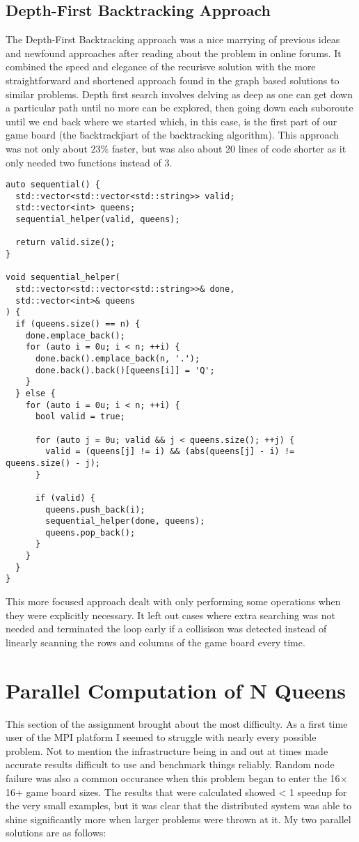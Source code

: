 \documentclass[11pt]{article}
\begin{document}
\subsection{Depth-First Backtracking Approach}
The Depth-First Backtracking approach was a nice marrying of previous ideas and newfound approaches after reading about the problem in online forums. It combined the speed and
elegance of the recurisve solution with the more straightforward and shortened approach found in the graph based solutions to similar problems.
Depth first search involves delving as deep as one can get down a particular path until no more can be explored, then going down each suboroute until we end back where we started which, in this case, is the first part of our game board (the \"backtrack\" part of the backtracking algorithm).
This approach was not only about 23\% faster, but was also about 20 lines of code shorter as it only needed two functions instead of 3.
\lstset{frame=tb,language=c++}
\begin{lstlisting}
auto sequential() {
  std::vector<std::vector<std::string>> valid;
  std::vector<int> queens;
  sequential_helper(valid, queens);

  return valid.size();
}

void sequential_helper(
  std::vector<std::vector<std::string>>& done,
  std::vector<int>& queens
) {
  if (queens.size() == n) {
    done.emplace_back();
    for (auto i = 0u; i < n; ++i) {
      done.back().emplace_back(n, '.');
      done.back().back()[queens[i]] = 'Q';
    }
  } else {
    for (auto i = 0u; i < n; ++i) {
      bool valid = true;

      for (auto j = 0u; valid && j < queens.size(); ++j) {
        valid = (queens[j] != i) && (abs(queens[j] - i) != queens.size() - j);
      }

      if (valid) {
        queens.push_back(i);
        sequential_helper(done, queens);
        queens.pop_back();
      }
    }
  }
}
\end{lstlisting}
This more focused approach dealt with only performing some operations when they were explicitly necessary. It left out cases where extra searching was not needed and terminated the loop early if a collisison was detected instead of linearly scanning the rows and columns of the game board every time.

\section{Parallel Computation of N Queens}
This section of the assignment brought about the most difficulty. As a first time user of the MPI platform I seemed to struggle with nearly every possible problem. Not to mention
the infrastructure being in and out at times made accurate results difficult to use and benchmark things reliably. Random node failure was also a common occurance when this problem began to enter the 16$\times$16+ game board sizes. The results that were calculated showed < 1 speedup for the very small examples, but it was clear that the distributed system was able to shine significantly more when larger problems were thrown at it.
My two parallel solutions are as follows:
\end{document}

